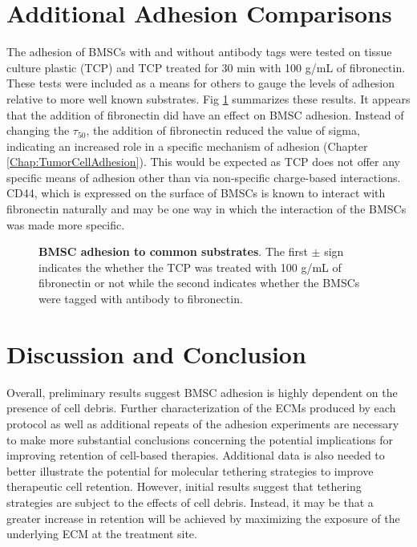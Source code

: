 \section{Additional Adhesion Comparisons}
The adhesion of BMSCs with and without antibody tags were tested on tissue culture plastic (TCP) and TCP treated for 30 min with 100 \textmu g/mL of fibronectin. These tests were included as a means for others to gauge the levels of adhesion relative to more well known substrates. Fig \ref{Chap:Cardiac:fig:standards} summarizes these results. It appears that the addition of fibronectin did have an effect on BMSC adhesion. Instead of changing the $\tau_{50}$, the addition of fibronectin reduced the value of sigma, indicating an increased role in a specific mechanism of adhesion (Chapter \ref{Chap:TumorCellAdhesion}). This would be expected as TCP does not offer any specific means of adhesion other than via non-specific charge-based interactions. CD44, which is expressed on the surface of BMSCs is known to interact with fibronectin naturally and may be one way in which the interaction of the BMSCs was made more specific.

\begin{figure}[!t]
\centering
{}
\caption{\textbf{BMSC adhesion to common substrates}. The first $\pm$ sign indicates the whether the TCP was treated with 100 \textmu g/mL of fibronectin or not while the second indicates whether the BMSCs were tagged with antibody to fibronectin.}
\label{Chap:Cardiac:fig:standards}
\end{figure}

\section{Discussion and Conclusion}
Overall, preliminary results suggest BMSC adhesion is highly dependent on the presence of cell debris. Further characterization of the ECMs produced by each protocol as well as additional repeats of the adhesion experiments are necessary to make more substantial conclusions concerning the potential implications for improving retention of cell-based therapies. Additional data is also needed to better illustrate the potential for molecular tethering strategies to improve therapeutic cell retention. However, initial results suggest that tethering strategies are subject to the effects of cell debris. Instead, it may be that a greater increase in retention will be achieved by maximizing the exposure of the underlying ECM at the treatment site.

